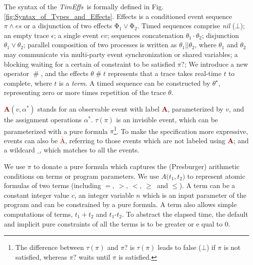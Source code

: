 \documentclass[acmsmall,10pt,review]{acmart}
\newcommand{\es}{\theta}
\newcommand{\timedEffects}{\emph{TimEffs}}
\newcommand{\effect}{{\ensuremath{\mathrm{\Phi}}}}
\newcommand{\anyevent}[1]{{\textcolor{darkred}
{{\textbf{\footnotesize #1}}}}}
\newcommand{\anynotevent}[1]{{\textcolor{darkred}
{{\textbf{\footnotesize $\overline{\text{#1}}$}}}}}
\newcommand{\code}[1]{{\tt{\ensuremath{\m{#1}}}}}
\newcommand{\m}{\mathit}
\newcommand{\mysharp}{{\mathrel{\texttt{\#}}}}
\newcommand\figref[1]{Fig. \textcolor{black}{\ref{#1}}.}
\begin{document}
{The  syntax of the \timedEffects\ is formally defined in 
\figref{fig:Syntax_of_Types_and_Effects} Effects is 
 a conditioned event sequence \code{{\pi}\wedge es} or a disjunction of 
 two effects $\effect_1 \vee \effect_2$.
Timed sequences comprise \textit{nil} ($\bot $);
 an empty trace $ \epsilon$;
a single event \code{ev};
 sequences concatenation \code{\es_1\cdot \es_2};
disjunction  \code{\es_1\vee \es_2};
parallel composition of two processes is written as \code{\es_1 || \es_2}, where \code{\es_1} and \code{\es_2} 
may communicate via multi-party event synchronization or shared variables;
a blocking waiting for a certain of constraint to be satisfied \code{\pi ?}; 
We introduce a new operator \code{\mysharp }, and the effects 
\code{\es \mysharp t} represents that a trace takes real-time 
\code{t} to complete, where \code{t} is a \emph{term}. 
A timed sequence can be constructed by \code{\es^\star}, representing zero or 
more times repetition of the trace \code{\es}.

\anyevent{A}\code{(v, \alpha^*)} stands for an observable event with label 
\anyevent{A}, parameterized by \code{v}, and the assignment operations \code{\alpha^*}. 
\code{\tau(\pi)} is an invisible event, which can be parameterized with a pure formula 
\code{\pi}\footnote{The difference between 
\code{\tau(\pi)} and \code{\pi?} is \code{\tau(\pi)} leads to false (\code{\bot}) if 
\code{\pi} is not satisfied, whereas  \code{\pi?} waits until \code{\pi} is satisfied.}. 
To make the specification more expressive, events can also be 
{\anynotevent{A}}, referring to those events which are not 
labeled using \anyevent{A}; and a wildcard \code{\_}, which matches to all the events.



We use \code{{\pi}} to donate a pure formula which captures the (Presburger) arithmetic conditions on terms or program parameters. 
We use \code{{A(}{t_1, t_2}{)}} to represent atomic formulas of two terms (including $  {=},
   \ {>},
   \ {<},
   \ {\geq}\ $ and $ {\leq} $).
A term can be a constant integer value \code{c}, an integer variable \code{n} which is an input parameter of the program and can be constrained by a pure formula. 
A term also allows simple computations of terms, \code{t_1{+}t_2} and \code{t_1\text{-}t_2}. To abstract the elapsed time, the default and implicit pure constraints of all the terms is to be greater or e
qual to  0. 


}
\end{document}

